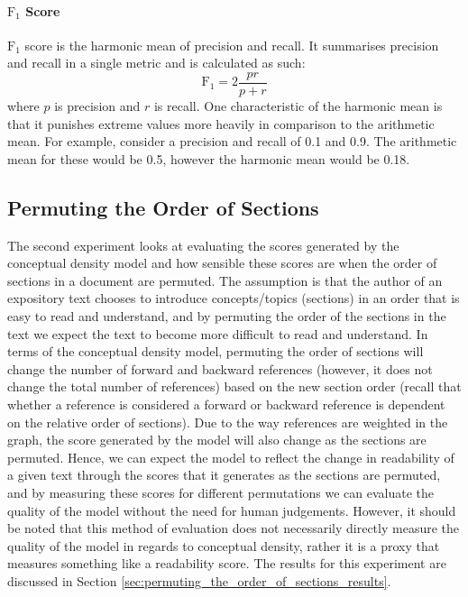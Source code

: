 \documentclass[12pt]{article}
\theoremstyle{grammarstyle}
\begin{document}
\paragraph{$\text{F}_1$ Score} $\text{F}_1$ score is the harmonic mean of precision and recall. It summarises precision and recall in a single metric and is calculated as such:
\begin{equation*}
    \text{F}_1 = 2 \frac{p r}{p + r}
\end{equation*}
where $p$ is precision and $r$ is recall. One characteristic of the harmonic mean is that it punishes extreme values more heavily in comparison to the arithmetic mean. For example, consider a precision and recall of 0.1 and 0.9. The arithmetic mean for these would be 0.5, however the harmonic mean would be 0.18.

\subsection{Permuting the Order of Sections}
The second experiment looks at evaluating the scores generated by the conceptual density model and how sensible these scores are when the order of sections in a document are permuted.
The assumption is that the author of an expository text chooses to introduce concepts/topics (sections) in an order that is easy to read and understand, and by permuting the order of the sections in the text we expect the text to become more difficult to read and understand.
In terms of the conceptual density model, permuting the order of sections will change the number of forward and backward references (however, it does not change the total number of references) based on the new section order (recall that whether a reference is considered a forward or backward reference is dependent on the relative order of sections).
Due to the way references are weighted in the graph, the score generated by the model will also change as the sections are permuted.
Hence, we can expect the model to reflect the change in readability of a given text through the scores that it generates as the sections are permuted, and by measuring these scores for different permutations we can evaluate the quality of the model without the need for human judgements.
However, it should be noted that this method of evaluation does not necessarily directly measure the quality of the model in regards to conceptual density, rather it is a proxy that measures something like a readability score. The results for this experiment are discussed in Section \ref{sec:permuting_the_order_of_sections_results}.
\end{document}
